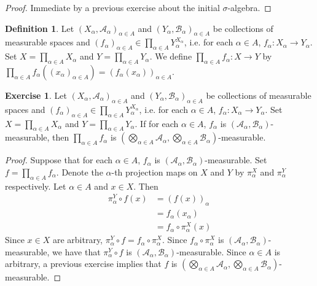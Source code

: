 \documentclass{book}
\theoremstyle{definition}
\newtheorem{defn}[definition]{Definition}
\newtheorem{ex}[definition]{Exercise}
\newcommand{\al}{\alpha}
\newcommand{\sig}{\sigma}
\newcommand{\MA}{\mathcal{A}}
\newcommand{\MB}{\mathcal{B}}
\newcommand{\lex}[1]{\label{ex:#1}}
\newcommand{\ld}[1]{\label{defn:#1}}
\DeclareMathOperator*{\0}{\mbf{0}}
\DeclareMathOperator*{\1}{\mbf{1}}
\begin{document}
	\begin{proof}
		Immediate by a previous exercise about the initial $\sig$-algebra.
	\end{proof}
	
	\begin{defn} \ld{25007}
		Let $(X_{\al}, \MA_{\al})_{\al \in A}$ and $(Y_{\al}, \MB_{\al})_{\al \in A}$ be collections of measurable spaces and $(f_{\al})_{\al \in A} \in \prod\limits_{\al \in A} Y_{\al}^{X_{\al}}$, i.e. for each $\al \in A$, $f_{\al}:X_{\al} \rightarrow Y_{\al}$. Set $X = \prod\limits_{\al \in A} X_{\al}$ and $Y = \prod\limits_{\al \in A}Y_{\al}$. We define $\prod_{\al \in A} f_{\al}: X \rightarrow Y$ by $\prod_{\al \in A} f_{\al} ((x_{\al})_{\al \in A}) = (f_{\al}(x_{\al}))_{\al \in A}$.
	\end{defn}
	
	\begin{ex} \lex{25008}
		Let $(X_{\al}, \MA_{\al})_{\al \in A}$ and $(Y_{\al}, \MB_{\al})_{\al \in A}$ be collections of measurable spaces and $(f_{\al})_{\al \in A} \in \prod\limits_{\al \in A} Y_{\al}^{X_{\al}}$, i.e. for each $\al \in A$, $f_{\al}:X_{\al} \rightarrow Y_{\al}$. Set $X = \prod\limits_{\al \in A} X_{\al}$ and $Y = \prod\limits_{\al \in A}Y_{\al}$. If for each $\al \in A$, $f_{\al}$ is $(\MA_{\al}, \MB_{\al})$-measurable, then $\prod_{\al \in A} f_{\al}$ is $(\bigotimes\limits_{\al \in A} \MA_{\al}, \bigotimes\limits_{\al \in A} \MB_{\al})$-measurable.
	\end{ex}
	
	\begin{proof} Suppose that for each $\al \in A$, $f_{\al}$ is $(\MA_{\al}, \MB_{\al})$-measurable. Set $f = \prod_{\al \in A} f_{\al}$. Denote the $\al$-th projection maps on $X$ and $Y$ by $\pi^X_{\al}$ and $\pi^Y_{\al}$ respectively. Let $\al \in A$ and $x \in X$. Then
		\begin{align*}
			\pi^Y_{\al} \circ f(x) 
			& = (f(x))_{\al} \\
			& = f_{\al}(x_{\al}) \\
			& = f_{\al} \circ \pi^X_{\al}(x) 
		\end{align*}
		Since $x \in X$ are arbitrary, $\pi^Y_{\al} \circ f = f_{\al} \circ \pi^X_{\al}$. Since $f_{\al} \circ \pi^X_{\al}$ is $(\MA_{\al}, \MB_{\al})$-measurable, we have that $\pi^Y_{\al} \circ f$ is $(\MA_{\al}, \MB_{\al})$-measurable. Since $\al \in A$ is arbitrary, a previous exercise implies that $f$ is $(\bigotimes\limits_{\al \in A} \MA_{\al}, \bigotimes\limits_{\al \in A} \MB_{\al})$-measurable.
	\end{proof}
\end{document}
